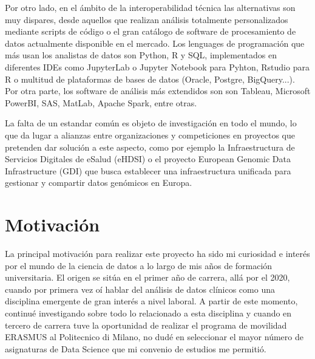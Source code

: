 Por otro lado, en el ámbito de la interoperabilidad técnica las alternativas son muy dispares, desde aquellos que realizan análisis totalmente personalizados mediante scripts de código o el gran catálogo de software de procesamiento de datos actualmente disponible en el mercado. Los lenguages de programación que más usan los analistas de datos son Python, R y SQL, implementados en diferentes IDEs como JupyterLab o Jupyter Notebook para Pyhton, Rstudio para R o multitud de plataformas de bases de datos (Oracle, Postgre, BigQuery...). Por otra parte, los software de análisis más extendidos son son Tableau, Microsoft PowerBI, SAS, MatLab, Apache Spark, entre otras. 


La falta de un estandar común es objeto de investigación en todo el mundo, lo que da lugar a alianzas entre organizaciones y competiciones en proyectos que pretenden dar solución a este aspecto, como por ejemplo la Infraestructura de Servicios Digitales de eSalud (eHDSI) \cite{DHE2023eHDSI} %
o el proyecto European Genomic Data Infrastructure (GDI) \cite{GDI2022GDI} que busca establecer una infraestructura unificada para gestionar y compartir datos genómicos en Europa.



\section{Motivación} \label{sec:01Motivacion}


La principal motivación para realizar este proyecto ha sido mi curiosidad e interés por el mundo de la ciencia de datos a lo largo de mis años de formación universitaria. El origen se sitúa en el primer año de carrera, allá por el 2020, cuando por primera vez oí hablar del análisis de datos clínicos como una disciplina emergente de gran interés a nivel laboral. A partir de este momento, continué investigando sobre todo lo relacionado a esta disciplina y cuando en tercero de carrera tuve la oportunidad de realizar el programa de movilidad ERASMUS al Politecnico di Milano, no dudé en seleccionar el mayor número de asignaturas de Data Science que mi convenio de estudios me permitió. 

